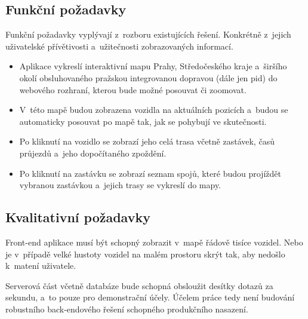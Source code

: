 \subsection{Funkční požadavky}


Funkční požadavky vyplývají z~rozboru existujících řešení. Konkrétně z~jejich uživatelské přívětivosti a~užitečnosti zobrazovaných informací.


\begin{itemize}


\item Aplikace vykreslí interaktivní mapu Prahy, Středočeského kraje a~širšího okolí obsluhovaného pražskou integrovanou dopravou (dále jen \gls{pid}) do webového rozhraní, kterou bude možné posouvat či zoomovat.


\item V~této mapě budou zobrazena vozidla na aktuálních pozicích a~budou se automaticky posouvat po mapě tak, jak se pohybují ve skutečnosti.


\item Po kliknutí na vozidlo se zobrazí jeho celá trasa včetně zastávek, časů průjezdů a~jeho dopočítaného zpoždění.


\item Po kliknutí na zastávku se zobrazí seznam spojů, které budou projíždět vybranou zastávkou a~jejich trasy se vykreslí do mapy.


\end{itemize}


\subsection{Kvalitativní požadavky}


Front-end aplikace musí být schopný zobrazit v~mapě řádově tisíce vozidel. Nebo je v~případě velké hustoty vozidel na malém prostoru skrýt tak, aby nedošlo k~matení uživatele.


\bigbreak


Serverová část včetně databáze bude schopná obsloužit desítky dotazů za sekundu, a~to pouze pro demonstrační účely. Účelem práce tedy není budování robustního back-endového řešení schopného produkčního nasazení.
